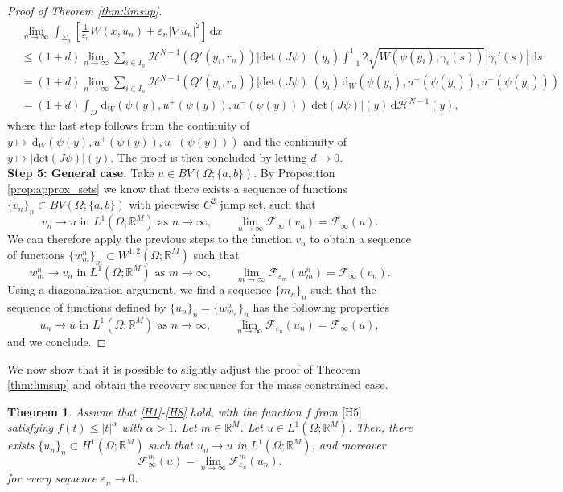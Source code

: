 \documentclass[a4paper, 11pt, reqno]{amsart}
\theoremstyle{plain}
\newtheorem{theorem}{Theorem}[section]
\theoremstyle{definition}
\theoremstyle{remark}
\newcommand{\R}{\mathbb R}
\newcommand{\eps}{\varepsilon}
\newcommand{\dd}{\,\mathrm{d}}
\begin{document}
\begin{proof}[Proof of Theorem \ref{thm:limsup}]
\begin{align*}
    &\lim_{n \to \infty} \int_{\Sigma_n} \left[ \frac{1}{\varepsilon_n} W(x,u_n) + \varepsilon_n |\nabla u_n|^2 \right] \dd x \\
    &\leq (1+d) \lim_{n \to \infty} \sum_{i \in I_n} \mathcal{H}^{N-1} (Q'(y_i, r_n)) | \mathrm{det}(J\psi)|(y_i) \int_{-1}^1 2 \sqrt{W(\psi(y_i), \gamma_i(s))} | \gamma_i'(s)| \dd s \\
    &= (1+d) \lim_{n \to \infty} \sum_{i \in I_n} \mathcal{H}^{N-1} (Q'(y_i, r_n)) | \mathrm{det}(J\psi)|(y_i) \dd_W(\psi(y_i), u^+(\psi(y_i)),u^-(\psi(y_i))) \\
    &= (1+d) \int_D \dd_W (\psi(y), u^+(\psi(y)),u^-(\psi(y))) | \mathrm{det}(J\psi)|(y) \dd \mathcal{H}^{N-1} (y),
\end{align*}
where the last step follows from the continuity of $ y \mapsto \dd_W(\psi(y), u^+(\psi(y)),u^-(\psi(y)))$ and the continuity of $y \mapsto | \mathrm{det}(J\psi)|(y)$. The proof is then concluded by letting $d \to 0$.\\[0.5em]
\textbf{Step 5: General case.} Take $u \in BV(\Omega; \{a,b\})$. By Proposition \ref{prop:approx_sets} we know that there exists a sequence of functions $\{ v_n \}_n \subset BV(\Omega; \{a,b\})$ with piecewise $C^2$ jump set, such that 
$$ v_n \to u \text{ in } L^1(\Omega; \R^M) \text{ as } n \to \infty, \qquad \lim_{n\to \infty} \mathcal{F}_\infty(v_n) = \mathcal{F}_\infty (u). $$
We can therefore apply the previous steps to the function $v_n$ to obtain a sequence of functions $\{w_m^n\}_m \subset W^{1,2}(\Omega; \R^M)$ such that  
$$ w_m^n \to v_n \text{ in } L^1(\Omega; \R^M) \text{ as } m \to \infty, \qquad \lim_{m\to \infty} \mathcal{F}_{\varepsilon_m}(w_m^n) = \mathcal{F}_\infty (v_n). $$
Using a diagonalization argument, we find a sequence $\{m_n\}_n$ such that the sequence of functions defined by $\{u_n\}_n = \{w_{m_n}^n\}_n$ has the following properties
$$ u_n \to u \text{ in } L^1(\Omega; \R^M) \text{ as } n \to \infty, \qquad \lim_{n\to \infty} \mathcal{F}_{\varepsilon_n} (u_n) = \mathcal{F}_\infty (u), $$
and we conclude.
\end{proof}

We now show that it is possible to slightly adjust the proof of Theorem \ref{thm:limsup} and obtain the recovery sequence for the mass constrained case.

\begin{theorem}\label{thm:limsup_mass}
    Assume that \ref{H1}-\ref{H8} hold, with the function $f$ from $\ref{H5}$ satisfying $f(t) \leq |t|^\alpha$ with $\alpha > 1$.
    Let $m\in\R^M$.
    Let $u \in L^1(\Omega;\R^M)$. Then, there exists $\{u_n\}_n \subset H^1(\Omega;\R^M)$ such that $u_n \to u$ in $L^1(\Omega;\R^M)$, and moreover
    \[
        \mathcal{F}^m_\infty(u) = \lim_{n \to \infty} \mathcal{F}^m_{\eps_n}(u_n).
    \]
    for every sequence $\eps_n \to 0$.
\end{theorem}
\end{document}
